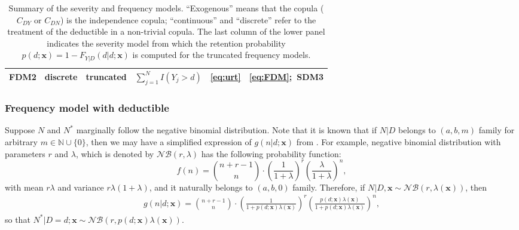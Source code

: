 \documentclass[11pt]{article}
\newcommand{\rev}[1]{{\color{blue}#1}}
\newcommand{\authnote}[1]{{\color{red}[\textbf{Note to authors:} #1]}}
\begin{document}
\begin{table}[!ht]
\begin{tabular}{llllcc}
FDM2 & discrete   & truncated       & $\sum_{j=1}^{N} I(Y_j>d)$    & \eqref{eq:urt} & \eqref{eq:FDM};\ SDM3 \\
\bottomrule
\end{tabular}
\caption{\rev{Summary of the severity and frequency models. ``Exogenous'' means that the copula ($C_{DY}$ or $C_{DN}$) is the independence copula; ``continuous'' and ``discrete'' refer to the treatment of the deductible in a non-trivial copula. The last column of the lower panel indicates the severity model from which the retention probability $p(d;\bm{x})=1-F_{Y|D}(d|d;\bm{x})$ is computed for the truncated frequency models.}}
\label{tab:modelsummary}
\end{table}

\subsubsection{Frequency model with deductible}
Suppose $N$ and $N^*$ marginally follow the negative binomial distribution. Note that it is known that if $N|D$ belongs to $(a,b,m)$ family for arbitrary $m \in \mathbb{N} \cup \{ 0 \}$, then we may have a simplified expression of $g(n|d;\bm{x})$ from \citet{Klugman2012}. For example, negative binomial distribution with parameters $r$ and $\lambda$, which is denoted by $\mathcal{NB}(r, \lambda)$ has the following probability function:
$$
f(n)=	 {n+r-1 \choose n} \cdot \left( \frac{1}{1+\lambda} \right)^{r} \left( \frac{\lambda}{1+\lambda} \right)^{n},
$$
\rev{with mean $r\lambda$ and variance $r\lambda(1+\lambda)$,} and it naturally belongs to $(a,b,0)$ family. Therefore, if $N|D, \bm{x} \sim \mathcal{NB}(r, \lambda(\bm{x}))$, then
\begin{equation} 
\begin{aligned}  \label{eq:fg}
g(n|d;\bm{x})=	 {n+r-1 \choose n} \cdot \left( \frac{1}{1+p(d;\bm{x})\lambda(\bm{x})} \right)^{r} \left( \frac{p(d;\bm{x})\lambda(\bm{x})}{1+p(d;\bm{x})\lambda(\bm{x})} \right)^{n},
\end{aligned}
\end{equation}
so that $N^*|D=d; \bm{x} \sim \mathcal{NB}(r, p(d;\bm{x}) \lambda(\bm{x}))$.
\end{document}
